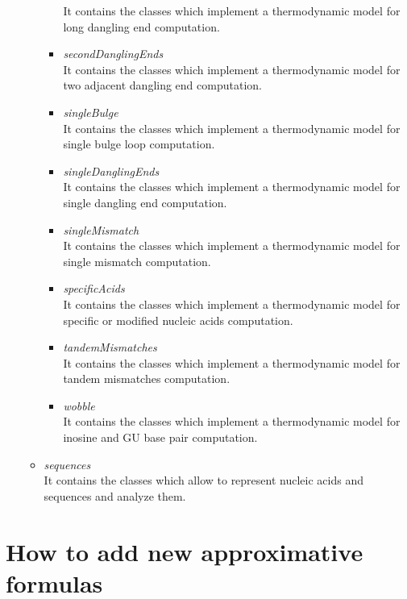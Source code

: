 \documentclass{article}
\begin{document}
\begin{itemize}
\begin{itemize}
\begin{itemize}
      It contains the classes which implement a thermodynamic model for long dangling end computation.
      \item \textit{secondDanglingEnds} \\
      It contains the classes which implement a thermodynamic model for two adjacent dangling end computation.
      \item \textit{singleBulge} \\
      It contains the classes which implement a thermodynamic model for single bulge loop computation.
      \item \textit{singleDanglingEnds} \\
      It contains the classes which implement a thermodynamic model for single dangling end computation.
      \item \textit{singleMismatch} \\
      It contains the classes which implement a thermodynamic model for single mismatch computation.
      \item \textit{specificAcids} \\
      It contains the classes which implement a thermodynamic model for specific or modified nucleic acids
      computation.
      \item \textit{tandemMismatches} \\
      It contains the classes which implement a thermodynamic model for tandem mismatches computation.
      \item \textit{wobble} \\
      It contains the classes which implement a thermodynamic model for inosine and GU base pair computation.
      \end{itemize} 
    \item \textit{sequences} \\
    It contains the classes which allow to represent nucleic acids and sequences and analyze them.
    \end{itemize}
\end{itemize}

\section{How to add new approximative formulas}
\end{document}
